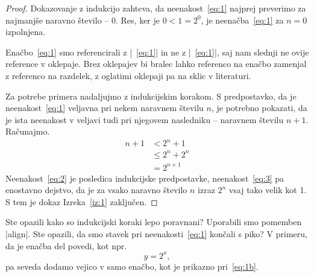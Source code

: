 \documentclass[9pt]{style/friteza}
\begin{document}
\begin{proof}
  Dokazovanje z indukcijo zahteva, da neenakost~\eqref{eq:1} najprej preverimo za najmanjše naravno število -- $0$.
  Res, ker je $0 < 1 = 2^0$, je neenačba~\eqref{eq:1} za $n=0$ izpolnjena.

  Enačbo~\eqref{eq:1} smo referencirali z \ltx|~\eqref{eq:1}| in ne z \ltx|~\ref{eq:1}|, saj nam slednji ne ovije reference v oklepaje. Brez oklepajev bi bralec lahko referenco na enačbo zamenjal z referenco na razdelek, z oglatimi oklepaji pa na sklic v literaturi.
  
  Za potrebe primera nadaljujmo z indukcijskim korakom. S predpostavko, da je neenakost~\eqref{eq:1} veljavna pri nekem naravnem številu $n$, je potrebno pokazati, da je ista neenakost v veljavi tudi pri njegovem nasledniku -- naravnem številu $n+1$.
  Računajmo.
  \begin{align}
    n+1 & < 2^n + 1       \label{eq:2}\\
    & \le 2^n + 2^n \label{eq:3}\\
    & = 2^{n+1}       \nonumber
  \end{align}
  Neenakost~\eqref{eq:2} je posledica indukcijske predpostavke, neenakost~\eqref{eq:3} pa enostavno dejstvo, da je za vsako naravno število $n$ izraz $2^n$ vsaj tako velik kot 1.
  S tem je dokaz Izreka~\ref{iz:1} zaključen.
\end{proof}

Ste opazili kako so indukcijski koraki lepo poravnani? Uporabili smo pomemben \ltx|align|. Ste opazili, da smo stavek pri neenakosti~\ref{eq:1} končali s piko? V primeru, da je enačba del povedi, kot npr.
 \begin{equation}
    y = 2^x,
    \label{eq:1b}
  \end{equation}
pa seveda dodamo vejico v samo enačbo, kot je prikazno pri~\eqref{eq:1b}. 

\end{document}

